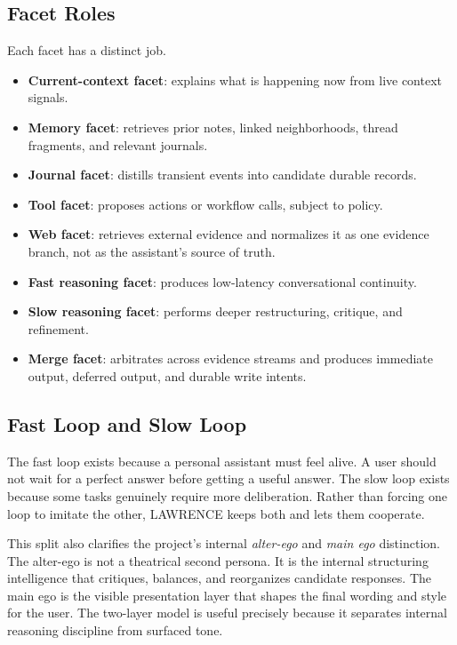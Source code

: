 \documentclass[conference]{IEEEtran}
\begin{document}
\subsection{Facet Roles}
Each facet has a distinct job.

\begin{itemize}
\item \textbf{Current-context facet}: explains what is happening now from live context signals.
\item \textbf{Memory facet}: retrieves prior notes, linked neighborhoods, thread fragments, and relevant journals.
\item \textbf{Journal facet}: distills transient events into candidate durable records.
\item \textbf{Tool facet}: proposes actions or workflow calls, subject to policy.
\item \textbf{Web facet}: retrieves external evidence and normalizes it as one evidence branch, not as the assistant's source of truth.
\item \textbf{Fast reasoning facet}: produces low-latency conversational continuity.
\item \textbf{Slow reasoning facet}: performs deeper restructuring, critique, and refinement.
\item \textbf{Merge facet}: arbitrates across evidence streams and produces immediate output, deferred output, and durable write intents.
\end{itemize}

\subsection{Fast Loop and Slow Loop}
The fast loop exists because a personal assistant must feel alive. A user should not wait for a perfect answer before getting a useful answer. The slow loop exists because some tasks genuinely require more deliberation. Rather than forcing one loop to imitate the other, LAWRENCE keeps both and lets them cooperate.

This split also clarifies the project's internal \emph{alter-ego} and \emph{main ego} distinction. The alter-ego is not a theatrical second persona. It is the internal structuring intelligence that critiques, balances, and reorganizes candidate responses. The main ego is the visible presentation layer that shapes the final wording and style for the user. The two-layer model is useful precisely because it separates internal reasoning discipline from surfaced tone.
\end{document}

